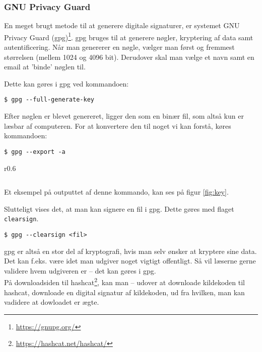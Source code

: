     \subsubsection{GNU Privacy Guard}
    En meget brugt metode til at generere digitale signaturer, er systemet GNU Privacy Guard (gpg)\footnote{\url{https://gnupg.org/}}.
    gpg bruges til at generere nøgler, kryptering af data samt autentificering.
    Når man genererer en nøgle, vælger man først og fremmest størrelsen (mellem 1024 og 4096 bit).
    Derudover skal man vælge et navn samt en email at 'binde' nøglen til.
    \par
    Dette kan gøres i gpg ved kommandoen:
    \begin{verbatim}
$ gpg --full-generate-key
    \end{verbatim}


    Efter nøglen er blevet genereret, ligger den som en binær fil, som altså kun er læsbar af computeren.
    For at konvertere den til noget vi kan forstå, køres kommandoen:


    \begin{verbatim}
$ gpg --export -a
    \end{verbatim}

    \begin{wrapfigure}{r}{0.6\textwidth}
        \vspace{-30pt}
        \begin{center}
            \inputminted[python3, breaklines, fontsize=\scriptsize]{bash}{src/public.key}
            \vspace{-20pt}
            \caption{1024-bit nøgle genereret i gpg}
            \label{fig:key}
        \end{center}
        \vspace{-50pt}
    \end{wrapfigure}

    Et eksempel på outputtet af denne kommando, kan ses på figur \ref{fig:key}.
    \par
    Slutteligt vises det, at man kan signere en fil i gpg.
    Dette gøres med flaget \texttt{clearsign}.
    \begin{verbatim}
$ gpg --clearsign <fil>
    \end{verbatim}

    gpg er altså en stor del af kryptografi, hvis man selv ønsker at kryptere sine data.
    Det kan f.eks. være idet man udgiver noget vigtigt offentligt.
    Så vil læserne gerne validere hvem udgiveren er -- det kan gøres i gpg.\\
    På downloadsiden til hashcat\footnote{\url{https://hashcat.net/hashcat/}}, kan man -- udover at downloade kildekoden til hashcat, downloade en digital signatur af kildekoden, ud fra hvilken, man kan vadidere at dowloadet er ægte.


